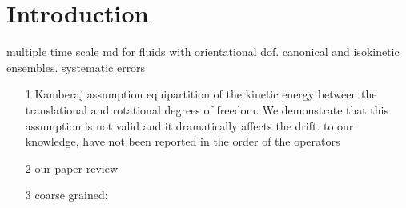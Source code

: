\documentclass[aip,jcp,reprint,amsmath,amssymb]{revtex4-1}
\begin{document}
\section{Introduction}
\cite{Omelyan_2011} multiple time scale md for fluids with orientational dof. canonical and isokinetic ensembles.
systematic errors
\begin{itemize}
\item[1] Kamberaj\cite{Kamberaj2005}\cite{Yan_2008,Akimov_2012,Geiger_2013} \cite{Aimoli_2014}
assumption equipartition of the kinetic energy between the translational and rotational degrees of freedom. We demonstrate that this assumption is not valid and it dramatically affects the drift.
to our knowledge, have not been reported in the
order of the operators
\item[2] our paper review
\item[3] coarse grained: 

\end{itemize}
\end{document}
